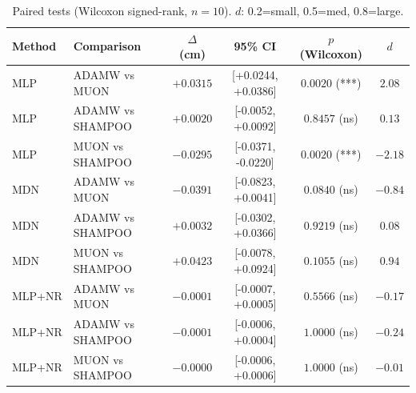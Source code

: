 \begin{table}[H]
\centering
\caption{Paired tests (Wilcoxon signed-rank, $n=10$). $d$: 0.2=small, 0.5=med, 0.8=large.}
\label{tab:stats}
\begin{tabular}{llcccc}
\toprule
Method & Comparison & $\Delta$ (cm) & 95\% CI & $p$ (Wilcoxon) & $d$ \\
\midrule
MLP & ADAMW vs MUON & $+0.0315$ & [+0.0244, +0.0386] & $0.0020$ (***) & $2.08$ \\
MLP & ADAMW vs SHAMPOO & $+0.0020$ & [-0.0052, +0.0092] & $0.8457$ (ns) & $0.13$ \\
MLP & MUON vs SHAMPOO & $-0.0295$ & [-0.0371, -0.0220] & $0.0020$ (***) & $-2.18$ \\
MDN & ADAMW vs MUON & $-0.0391$ & [-0.0823, +0.0041] & $0.0840$ (ns) & $-0.84$ \\
MDN & ADAMW vs SHAMPOO & $+0.0032$ & [-0.0302, +0.0366] & $0.9219$ (ns) & $0.08$ \\
MDN & MUON vs SHAMPOO & $+0.0423$ & [-0.0078, +0.0924] & $0.1055$ (ns) & $0.94$ \\
MLP+NR & ADAMW vs MUON & $-0.0001$ & [-0.0007, +0.0005] & $0.5566$ (ns) & $-0.17$ \\
MLP+NR & ADAMW vs SHAMPOO & $-0.0001$ & [-0.0006, +0.0004] & $1.0000$ (ns) & $-0.24$ \\
MLP+NR & MUON vs SHAMPOO & $-0.0000$ & [-0.0006, +0.0006] & $1.0000$ (ns) & $-0.01$ \\
\bottomrule
\end{tabular}
\end{table}